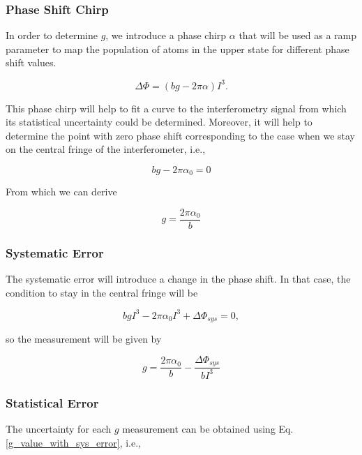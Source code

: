 \documentclass{article}
\begin{document}
\subsubsection{Phase Shift Chirp}
In order to determine $g$, we introduce a phase chirp $\alpha$ that will be used as a ramp parameter to map the population of atoms in the upper state for different phase shift values. 

\begin{equation}
    \Delta \Phi = (b g  - 2\pi \alpha) I^3.
\end{equation}

This phase chirp will help to fit a curve to the interferometry signal from which its statistical uncertainty could be determined. Moreover, it will help to determine the point with zero phase shift corresponding to the case when we stay on the central fringe of the interferometer, i.e.,

\begin{equation}
    b g  - 2\pi \alpha_{0} = 0
\end{equation}

From which we can derive

\begin{equation}
    g = \frac{2\pi \alpha_{0}}{b}
\end{equation}

\subsubsection{Systematic Error}
The systematic error will introduce a change in the phase shift. In that case, the condition to stay in the central fringe will be

\begin{equation}
    b g I^3 - 2\pi \alpha_{0} I^3 + \Delta \Phi_{sys}= 0,
\end{equation}

so the measurement will be given by

\begin{equation}\label{g_value_with_sys_error}
    g = \frac{2\pi \alpha_{0}}{b} - \frac{\Delta \Phi_{sys}}{b I^3}
\end{equation}

\subsubsection{Statistical Error}
The uncertainty for each $g$ measurement can be obtained using Eq. \ref{g_value_with_sys_error}, i.e.,
\end{document}
